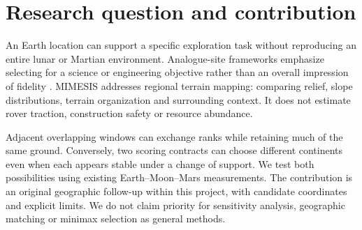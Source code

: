 \begin{abstract}
Terrain rankings can change without identifying a different physical landscape. We compare two scoring contracts at 500 m and 1,000 m support for six Moon and Mars targets using 3,693 overlapping NASADEM windows in the Namib and Atacama. The first contract uses four scaled terrain descriptors; the second combines four descriptor groups with a maximum over 35 sensitivity scenarios. Within a contract, the largest displacement of a winning center is 24.19 km. Between contracts, winners for Jezero and Syrtis move between Namibia and Chile, by 8,349--8,484 km. For Nili Fossae, the scalar top tens share no candidate identifiers, yet their winners are only 3.00 km apart and their 20 km footprints have intersection-over-union 0.739. Five of ten top-ten pairs can be matched one-to-one within 10 km. We release geographic shortlists selected by minimizing the worse rank across supports, with source hashes and reproducible calculations. This post hoc regional result separates identifier turnover, geographic turnover and scoring assumptions. It does not establish a new geological analogue or a safe base location. Independent source-quality and geological checks remain necessary, as illustrated by the accompanying MOLA sampling and lunar pit experiments.
\end{abstract}

\section{Research question and contribution}
An Earth location can support a specific exploration task without reproducing an entire lunar or Martian environment. Analogue-site frameworks emphasize selecting for a science or engineering objective rather than an overall impression of fidelity \cite{framework}. MIMESIS addresses regional terrain mapping: comparing relief, slope distributions, terrain organization and surrounding context. It does not estimate rover traction, construction safety or resource abundance.

Adjacent overlapping windows can exchange ranks while retaining much of the same ground. Conversely, two scoring contracts can choose different continents even when each appears stable under a change of support. We test both possibilities using existing Earth--Moon--Mars measurements. The contribution is an original geographic follow-up within this project, with candidate coordinates and explicit limits. We do not claim priority for sensitivity analysis, geographic matching or minimax selection as general methods.

